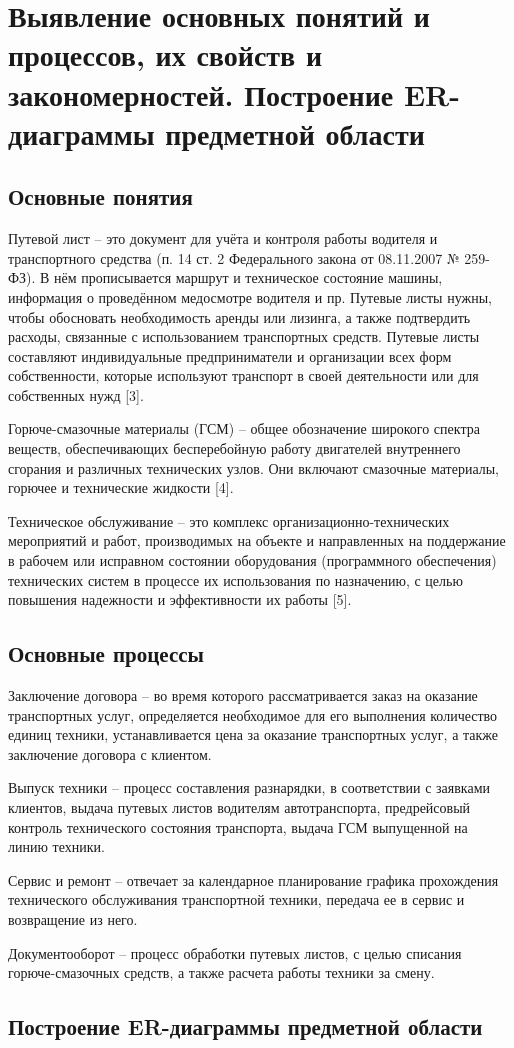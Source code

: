 \documentclass[../nirs.tex]{subfiles}
\begin{document}
\section{Выявление основных понятий и процессов, их свойств и закономерностей.
Построение ER-диаграммы предметной области}

\subsection{Основные понятия}
Путевой лист -- это документ для учёта и контроля работы водителя и
транспортного средства (п. 14 ст. 2 Федерального закона от 08.11.2007 № 259-ФЗ).
В нём прописывается маршрут и техническое состояние машины, информация о
проведённом медосмотре водителя и пр. Путевые листы нужны, чтобы обосновать
необходимость аренды или лизинга, а также подтвердить расходы, связанные с
использованием транспортных средств. Путевые листы составляют индивидуальные
предприниматели и организации всех форм собственности, которые используют
транспорт в своей деятельности или для собственных нужд [3].

Горюче-смазочные материалы (ГСМ) -- общее обозначение широкого спектра веществ,
обеспечивающих бесперебойную работу двигателей внутреннего сгорания и различных
технических узлов. Они включают смазочные материалы, горючее и технические
жидкости [4].

Техническое обслуживание -- это комплекс организационно-технических мероприятий
и работ, производимых на объекте и направленных на поддержание в рабочем или
исправном состоянии оборудования (программного обеспечения) технических систем в
процессе их использования по назначению, с целью повышения надежности и
эффективности их работы [5].

\subsection{Основные процессы}
Заключение договора -- во время которого рассматривается заказ на оказание
транспортных услуг, определяется необходимое для его выполнения количество
единиц техники, устанавливается цена за оказание транспортных услуг, а также
заключение договора с клиентом.

Выпуск техники -- процесс составления разнарядки, в соответствии с заявками
клиентов, выдача путевых листов водителям автотранспорта, предрейсовый контроль
технического состояния транспорта, выдача ГСМ выпущенной на линию техники.

Сервис и ремонт -- отвечает за календарное планирование графика прохождения
технического обслуживания транспортной техники, передача ее в сервис и
возвращение из него.

Документооборот -- процесс обработки путевых листов, с целью списания
горюче-смазочных средств, а также расчета работы техники за смену.

\subsection{Построение ER-диаграммы предметной области}
\end{document}
